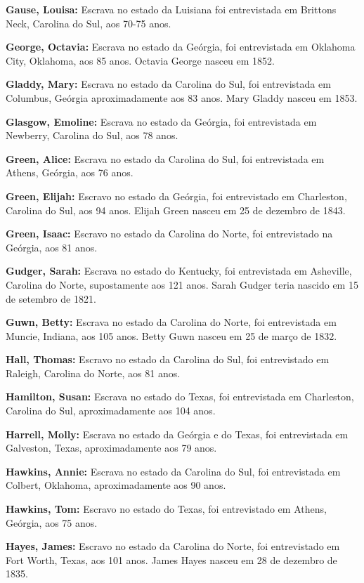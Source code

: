 \textbf{Gause, Louisa:} Escrava no estado da Luisiana foi entrevistada
em Brittons Neck, Carolina do Sul, aos 70-75 anos.

\textbf{George, Octavia:} Escrava no estado da Geórgia, foi entrevistada
em Oklahoma City, Oklahoma, aos 85 anos. Octavia George nasceu em 1852.

\textbf{Gladdy, Mary:} Escrava no estado da Carolina do Sul, foi
entrevistada em Columbus, Geórgia aproximadamente aos 83 anos. Mary
Gladdy nasceu em 1853.

\textbf{Glasgow, Emoline:} Escrava no estado da Geórgia, foi
entrevistada em Newberry, Carolina do Sul, aos 78 anos.

\textbf{Green, Alice:} Escrava no estado da Carolina do Sul, foi
entrevistada em Athens, Geórgia, aos 76 anos.

\textbf{Green, Elijah:} Escravo no estado da Geórgia, foi entrevistado
em Charleston, Carolina do Sul, aos 94 anos. Elijah Green nasceu em 25
de dezembro de 1843.

\textbf{Green, Isaac:} Escravo no estado da Carolina do Norte, foi
entrevistado na Geórgia, aos 81 anos.

\textbf{Gudger, Sarah:} Escrava no estado do Kentucky, foi entrevistada
em Asheville, Carolina do Norte, supostamente aos 121 anos. Sarah Gudger
teria nascido em 15 de setembro de 1821.

\textbf{Guwn, Betty:} Escrava no estado da Carolina do Norte, foi
entrevistada em Muncie, Indiana, aos 105 anos. Betty Guwn nasceu em 25
de março de 1832.

\textbf{Hall, Thomas:} Escravo no estado da Carolina do Sul, foi
entrevistado em Raleigh, Carolina do Norte, aos 81 anos.

\textbf{Hamilton, Susan:} Escrava no estado do Texas, foi entrevistada
em Charleston, Carolina do Sul, aproximadamente aos 104 anos.

\textbf{Harrell, Molly:} Escrava no estado da Geórgia e do Texas, foi
entrevistada em Galveston, Texas, aproximadamente aos 79 anos.

\textbf{Hawkins, Annie:} Escrava no estado da Carolina do Sul, foi
entrevistada em Colbert, Oklahoma, aproximadamente aos 90 anos.

\textbf{Hawkins, Tom:} Escravo no estado do Texas, foi entrevistado em
Athens, Geórgia, aos 75 anos.

\textbf{Hayes, James:} Escravo no estado da Carolina do Norte, foi
entrevistado em Fort Worth, Texas, aos 101 anos. James Hayes nasceu em
28 de dezembro de 1835.

